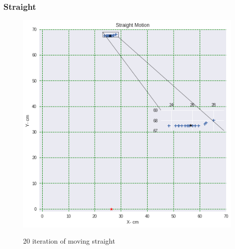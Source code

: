\documentclass[11pt,a4paper]{article}
\begin{document}
\begin{itemize}
		\subsubsection{Straight}
		\begin{figure}[H]
			\centering	
			\includegraphics[width=1.2\linewidth]{Straight}
			\label{fig:straight}
			\caption{20 iteration of moving straight}
		\end{figure}
		

\end{itemize}
\end{document}
